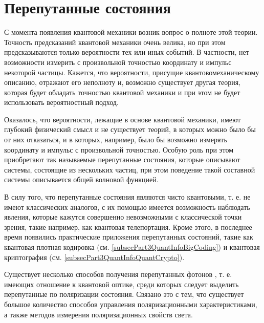 \chapter{Перепутанные состояния}
\label{chEntangl}

С момента появления квантовой механики возник вопрос о полноте
этой теории. Точность предсказаний квантовой механики очень велика, но
при этом 
предсказываются только вероятности тех или иных событий. В частности,
нет возможности измерить с произвольной точностью координату и
импульс некоторой частицы. Кажется, что
вероятности, присущие квантовомеханическому описанию, отражают его
неполноту и, возможно существует другая теория, которая будет обладать
точностью квантовой механики и при этом не будет использовать
вероятностный подход.

Оказалось, что вероятности, лежащие в основе квантовой механики, имеют
глубокий физический смысл и не существует теорий, в которых 
можно было бы от них отказаться, и в которых, например, было бы
возможно измерять координату и импульс с произвольной точностью. 
Особую роль при этом приобретают так называемые перепутанные
состояния, которые описывают системы, состоящие из нескольких частиц,
при этом поведение такой составной системы описывается общей волновой
функцией. 

В силу того, что перепутанные состояния являются чисто квантовыми,
т. е. не имеют классических аналогов, с их помощью имеется
возможность наблюдать явления, которые кажутся совершенно
невозможными с классической точки зрения, такие например, как квантовая
телепортация. Кроме этого, в последнее время появились практические
приложения перепутанных состояний, такие как квантовая плотная
кодировка 
(см. \ref{subsecPart3QuantInfoBigCoding})
и квантовая криптография
(см. \ref{subsecPart3QuantInfoQuantCrypto}).

Существует несколько способов получения перепутанных фотонов
\cite{bPhisQuantInfo}, т. е. имеющих отношение к квантовой оптике,
среди которых следует выделить перепутанные по поляризации
состояния. Связано это с тем, что существует большое количество
способов управления поляризационными характеристиками, а также
методов измерения поляризационных свойств света.


